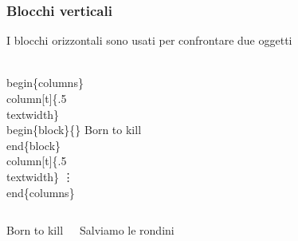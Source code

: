 \documentclass[svgnames,%
	ucs,%
	pdftex]{guitbeamer}
\begin{document}
\begin{frame}
  \frametitle{Blocchi verticali}
	I blocchi orizzontali sono usati per confrontare due oggetti 
	\begin{LaTeXcode}
		\\begin\{columns\}\n
	  \onslide<2->
		\hspace*{5ex}\\column[t]\{.5\\textwidth\}\n
	  \onslide<3->
		\hspace*{10ex}\alert{\\begin\{block\}\{\}}\n
		\hspace*{15ex} Born to kill\n
		\hspace*{10ex}\alert{\\end\{block\}}\n
	  \onslide<2->
		\hspace*{5ex}\\column[t]\{.5\\textwidth\}\n
	  \onslide<3->
		\hspace*{15ex}\vdots\n
	  \onslide<1->
		\\end\{columns\}	
	\end{LaTeXcode}
	\begin{columns}
		\begin{block}{}
		Born to kill
		\end{block}
		\begin{block}{}
		Salviamo le rondini
		\end{block}
	\end{columns}
\end{frame}
\end{document}
